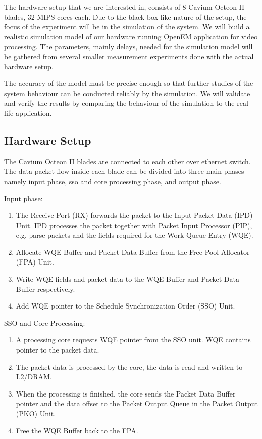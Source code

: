 The hardware setup that we are interested in, consists of 8 Cavium Octeon II blades, 32 MIPS cores each. Due to the black-box-like nature of the setup, the focus of the experiment will be in the simulation of the system. We will build a realistic simulation model of our hardware running OpenEM application for video processing. The parameters, mainly delays, needed for the simulation model will be gathered from several smaller measurement experiments done with the actual hardware setup.

The accuracy of the model must be precise enough so that further studies of the system behaviour can be conducted reliably by the simulation. We will validate and verify the results by comparing the behaviour of the simulation to the real life application.

\subsection{Hardware Setup}
The Cavium Octeon II blades are connected to each other over ethernet switch. The data packet flow inside each blade can be divided into three main phases namely input phase, sso and core processing phase, and output phase.

Input phase:
\begin{enumerate}
\item The Receive Port (RX) forwards the packet to the Input Packet Data (IPD) Unit. IPD processes the packet together with Packet Input Processor (PIP), e.g. parse packets and the fields required for the Work Queue Entry (WQE).
\item Allocate WQE Buffer and Packet Data Buffer from the Free Pool Allocator (FPA) Unit.
\item Write WQE fields and packet data to the WQE Buffer and Packet Data Buffer respectively.
\item Add WQE pointer to the Schedule Synchronization Order (SSO) Unit.
\end{enumerate}

SSO and Core Processing:
\begin{enumerate}
\item A processing core requests WQE pointer from the SSO unit. WQE contains pointer to the packet data.
\item The packet data is processed by the core, the data is read and written to L2/DRAM.
\item When the processing is finished, the core sends the Packet Data Buffer pointer and the data offset to the Packet Output Queue in the Packet Output (PKO) Unit.
\item Free the WQE Buffer back to the FPA.
\end{enumerate}

